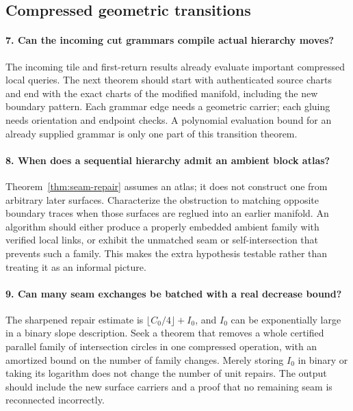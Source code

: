 \subsection{Compressed geometric transitions}

\paragraph{7. Can the incoming cut grammars compile actual hierarchy moves?}
The incoming tile and first-return results already evaluate important
compressed local queries\cite{incoming-disconnected,incoming-sparse,incoming-moments}.
The next theorem should start with authenticated source charts and end
with the exact charts of the modified manifold, including the new boundary
pattern.  Each grammar edge needs a geometric carrier; each gluing needs
orientation and endpoint checks.  A polynomial evaluation bound for an
already supplied grammar is only one part of this transition theorem.

\paragraph{8. When does a sequential hierarchy admit an ambient block atlas?}
Theorem~\ref{thm:seam-repair} assumes an atlas; it does not construct one
from arbitrary later surfaces.  Characterize the obstruction to matching
opposite boundary traces when those surfaces are reglued into an earlier
manifold.  An algorithm should either produce a properly embedded ambient
family with verified local links, or exhibit the unmatched seam or
self-intersection that prevents such a family.  This makes the extra
hypothesis testable rather than treating it as an informal picture.

\paragraph{9. Can many seam exchanges be batched with a real decrease bound?}
The sharpened repair estimate is
$\lfloor C_0/4\rfloor+I_0$, and $I_0$ can be exponentially large in a
binary slope description.  Seek a theorem that removes a whole certified
parallel family of intersection circles in one compressed operation, with
an amortized bound on the number of family changes.  Merely storing $I_0$
in binary or taking its logarithm does not change the number of unit
repairs.  The output should include the new surface carriers and a proof
that no remaining seam is reconnected incorrectly.

